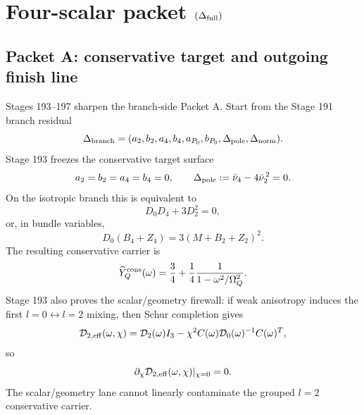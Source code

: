 
\section{Four-scalar packet \texorpdfstring{\((\Delta_{\rm full})\)}{(Deltafull)}}
\label{sec:part05_weak_axisymmetric_orbit:four-scalar-packet-delta-m-full}

\subsection{Packet A: conservative target and outgoing finish line}
Stages 193--197 sharpen the branch-side Packet A.  Start from the Stage 191 branch residual
\begin{equation}
\label{eq:part05-Delta-branch-full}
\Delta_{\rm branch}
=
(a_2,b_2,a_4,b_4,a_{P_0},b_{P_0},\Delta_{\rm pole},\Delta_{\rm norm}).
\end{equation}
Stage 193 freezes the conservative target surface
\begin{equation}
\label{eq:part05-conservative-target-surface}
a_2=b_2=a_4=b_4=0,
\qquad
\Delta_{\rm pole}:=\bar\nu_4-4\bar\nu_2^{\,2}=0.
\end{equation}
On the isotropic branch this is equivalent to
\begin{equation}
\label{eq:part05-one-pole-surface-D}
D_0D_4+3D_2^2=0,
\end{equation}
or, in bundle variables,
\begin{equation}
\label{eq:part05-one-pole-surface-bundle}
D_0(B_4+Z_4)=3(M+B_2+Z_2)^2.
\end{equation}
The resulting conservative carrier is
\begin{equation}
\label{eq:part05-conservative-one-pole-module}
\widehat Y_Q^{\rm cons}(\omega)
=
\frac34+\frac14\frac{1}{1-\omega^2/\Omega_Q^2}.
\end{equation}
Stage 193 also proves the scalar/geometry firewall: if weak anisotropy induces the first \(l=0\leftrightarrow l=2\) mixing, then Schur completion gives
\begin{equation}
\label{eq:part05-geometry-firewall-schur}
\mathcal D_{2,{\rm eff}}(\omega,\chi)
=
\mathcal D_2(\omega)I_3
-
\chi^2 C(\omega)\mathcal D_0(\omega)^{-1}C(\omega)^T,
\end{equation}
so
\begin{equation}
\label{eq:part05-geometry-firewall-result}
\partial_\chi\mathcal D_{2,{\rm eff}}(\omega,\chi)|_{\chi=0}=0.
\end{equation}
The scalar/geometry lane cannot linearly contaminate the grouped \(l=2\) conservative carrier.

